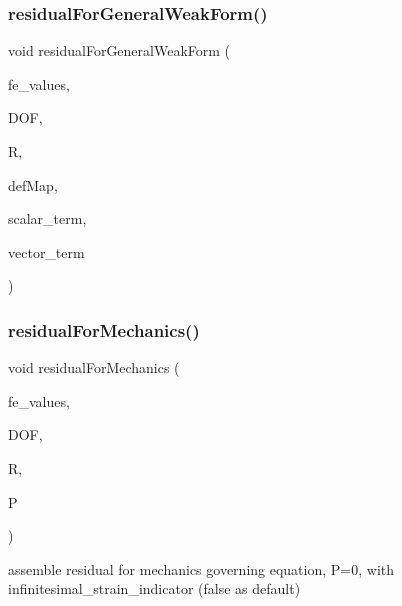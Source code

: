 \mbox{\label{class_residual_a478a5fee7d75f3a16707ad5915a34d3f}} 
\subsubsection{\texorpdfstring{residual\+For\+General\+Weak\+Form()}{residualForGeneralWeakForm()}\hspace{0.1cm}{\footnotesize\ttfamily [2/2]}}
{\footnotesize\ttfamily void residual\+For\+General\+Weak\+Form (\begin{DoxyParamCaption}\item[{const F\+E\+Values$<$ dim $>$ \&}]{fe\+\_\+values,  }\item[{unsigned int}]{D\+OF,  }\item[{dealii\+::\+Table$<$ 1, T $>$ \&}]{R,  }\item[{\mbox{\hyperlink{structdeformation_map}{deformation\+Map}}$<$ T, dim $>$ \&}]{def\+Map,  }\item[{dealii\+::\+Table$<$ 1, T $>$ \&}]{scalar\+\_\+term,  }\item[{dealii\+::\+Table$<$ 2, T $>$ \&}]{vector\+\_\+term }\end{DoxyParamCaption})}

\mbox{\label{class_residual_a432fe02216f182fd241f09775131f854}} 
\subsubsection{\texorpdfstring{residual\+For\+Mechanics()}{residualForMechanics()}}
{\footnotesize\ttfamily void residual\+For\+Mechanics (\begin{DoxyParamCaption}\item[{const F\+E\+Values$<$ dim $>$ \&}]{fe\+\_\+values,  }\item[{unsigned int}]{D\+OF,  }\item[{Table$<$ 1, T $>$ \&}]{R,  }\item[{dealii\+::\+Table$<$ 3, T $>$}]{P }\end{DoxyParamCaption})}

assemble residual for mechanics governing equation,  P=0, with infinitesimal\+\_\+strain\+\_\+indicator (false as default) \mbox{\label{class_residual_a34f1f680e957e21ac47c35f404e9fd6a}} 
